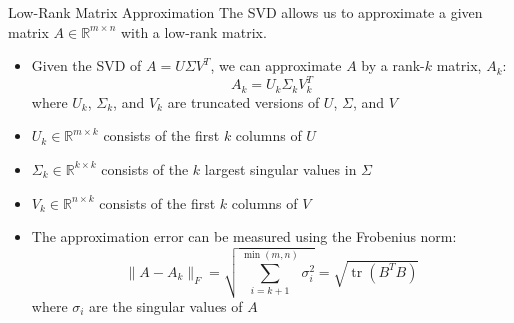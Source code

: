 \documentclass[fullscreen=true, bookmarks=true, hyperref={pdfencoding=unicode}]{beamer}
\begin{document}
\begin{frame}{Low-Rank Matrix Approximation}
  The SVD allows us to approximate a given matrix $A \in \mathbb{R}^{m \times n}$ with a low-rank matrix.

  \begin{itemize}
    \pause\item Given the SVD of $A = U \Sigma V^T$, we can approximate $A$ by a rank-$k$ matrix, $A_k$:
      \[
      A_k = U_k \Sigma_k V_k^T
      \]
      where $U_k$, $\Sigma_k$, and $V_k$ are truncated versions of $U$, $\Sigma$, and $V$

    \pause\item $U_k \in \mathbb{R}^{m \times k}$ consists of the first $k$ columns of $U$

    \pause\item $\Sigma_k \in \mathbb{R}^{k \times k}$ consists of the $k$ largest singular values in $\Sigma$

    \pause\item $V_k \in \mathbb{R}^{n \times k}$ consists of the first $k$ columns of $V$

    \pause\item The approximation error can be measured using the Frobenius norm:
      \[
      \|A - A_k\|_F = \sqrt{\sum_{i=k+1}^{\min(m, n)} \sigma_i^2} = \sqrt{\operatorname{tr}(B^TB)}
      \]
      where $\sigma_i$ are the singular values of $A$
  \end{itemize}
\end{frame}
\end{document}
